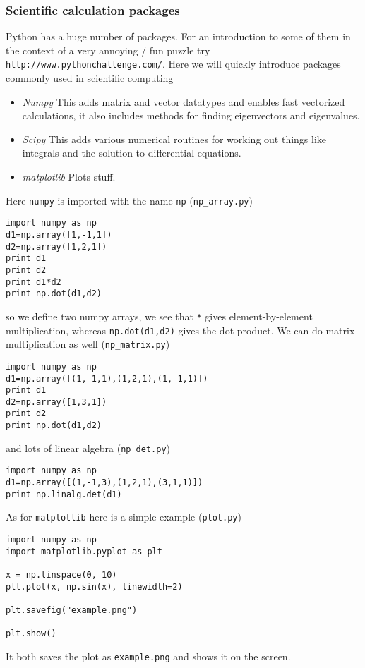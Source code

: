 \documentclass[11pt,a4paper]{scrartcl}
\begin{document}
\subsubsection*{Scientific calculation packages}

Python has a huge number of packages. For an introduction to some of
them in the context of a very annoying / fun puzzle try
\texttt{http://www.pythonchallenge.com/}. Here we will quickly
introduce packages commonly used in scientific computing 
\begin{itemize}
\item \textsl{Numpy} This adds matrix and vector datatypes and enables
  fast vectorized calculations, it also includes methods for finding
  eigenvectors and eigenvalues.
\item \textsl{Scipy} This adds various numerical routines for working out things like integrals and the solution to differential equations.
\item \textsl{matplotlib} Plots stuff.
\end{itemize}

Here \texttt{numpy} is imported with the name \texttt{np}  (\texttt{np\_array.py})
\begin{lstlisting}[numbers=right]
import numpy as np
d1=np.array([1,-1,1])
d2=np.array([1,2,1])
print d1
print d2
print d1*d2
print np.dot(d1,d2)
\end{lstlisting}
so we define two numpy arrays, we see that \texttt{*} gives element-by-element multiplication, whereas \texttt{np.dot(d1,d2)} gives the dot product. We can do matrix multiplication as well  (\texttt{np\_matrix.py})
\begin{lstlisting}[numbers=right]
import numpy as np
d1=np.array([(1,-1,1),(1,2,1),(1,-1,1)])
print d1
d2=np.array([1,3,1])
print d2
print np.dot(d1,d2)
\end{lstlisting}
and lots of linear algebra  (\texttt{np\_det.py})
\begin{lstlisting}[numbers=right]
import numpy as np
d1=np.array([(1,-1,3),(1,2,1),(3,1,1)])
print np.linalg.det(d1)
\end{lstlisting}

As for \texttt{matplotlib} here is a simple example  (\texttt{plot.py})
\begin{lstlisting}[numbers=right]
import numpy as np
import matplotlib.pyplot as plt

x = np.linspace(0, 10)
plt.plot(x, np.sin(x), linewidth=2)

plt.savefig("example.png")

plt.show()
\end{lstlisting}
It both saves the plot as \texttt{example.png} and shows it on the screen.
\end{document}
